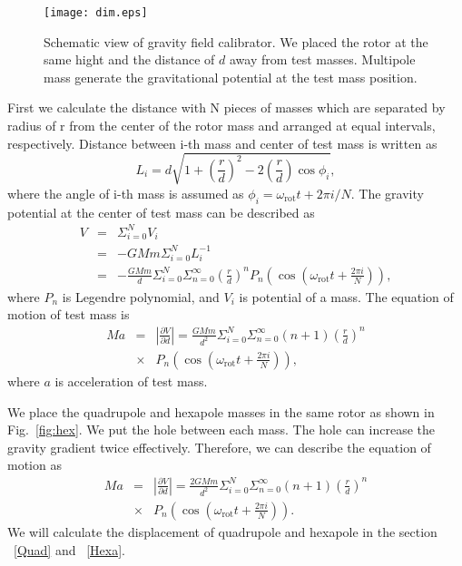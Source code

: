 \documentclass[%
 reprint,
superscriptaddress,
 amsmath,amssymb,
 aps,
]{revtex4-1}
\begin{document}
\begin{figure}
\begin{center}
\texttt{[image: dim.eps]}
\caption{Schematic view of gravity field calibrator. We placed the rotor at  the same hight and the distance of $d$ away from test masses. Multipole mass generate the gravitational potential at the test mass position.}
\label{fig:dim}
\end{center}
\end{figure}
First we calculate the distance with N pieces of masses which are separated by radius of r from the center of the rotor mass and arranged at equal intervals, respectively.
Distance between i-th mass and center of test mass is written as
\begin{equation}
L_i=d \sqrt{1+\left( \frac{r}{d} \right)^2 -2\left( \frac{r}{d} \right) \cos{\phi_i} },
\end{equation}
where the angle of i-th mass is assumed as $\phi_i=\omega_{\mathrm{rot}} t + 2\pi i/N$.
The gravity potential at the center of test mass can be described as
\begin{eqnarray}
V &=& \Sigma^N_{i=0} V_i \\
&=& -GMm \Sigma^N_{i=0}L_i^{-1}\\
&=&-\frac{G\!M\!m\!}{d} \Sigma^N_{i=0} \Sigma^{\infty}_{n=0}\! \left(\! \frac{r}{d}\! \right)^n
\!P_n\! \left(\! \cos{\!\left( \! \omega_{\mathrm{rot}} t \!+\!\frac{2 \pi i}{N}\right)\!}\right),
\end{eqnarray}
where $P_n$ is Legendre polynomial, and $V_i$ is potential of a mass. The equation of motion of test mass is 
\begin{eqnarray}
Ma&=&\left| \frac{\partial V}{\partial{d}} \right| =\frac{GMm}{d^2}\Sigma^N_{i=0} \Sigma^{\infty}_{n=0}(n+1) \left( \frac{r}{d} \right)^n \nonumber \\
&\times& P_n\left(\cos{\left(\omega_{\mathrm{rot}} t +\frac{2 \pi i}{N}\right)}\right),
\end{eqnarray}
where $a$ is acceleration of test mass. 

We place the quadrupole and hexapole masses in the same rotor as shown in Fig.~\ref{fig:hex}. We put the hole between each mass. The hole can increase the gravity gradient twice effectively. Therefore, we can describe the equation of motion as 
\begin{eqnarray}
Ma&=&\left| \frac{\partial V}{\partial{d}} \right| =\frac{2GMm}{d^2}\Sigma^N_{i=0} \Sigma^{\infty}_{n=0}(n+1) \left( \frac{r}{d} \right)^n \nonumber \\
&\times& P_n\left(\cos{\left(\omega_{\mathrm{rot}} t +\frac{2 \pi i}{N}\right)}\right). \label{eq:EOM}
\end{eqnarray}
We will calculate the displacement of quadrupole and hexapole in the section ~\ref{Quad}  and ~\ref{Hexa}.
\end{document}
